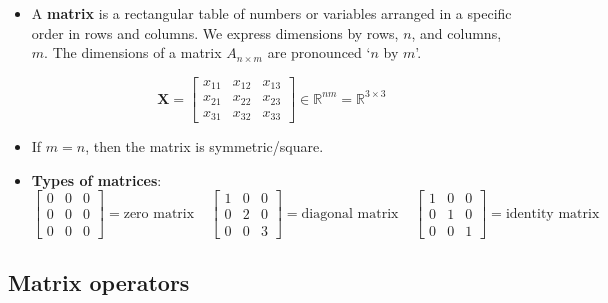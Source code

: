 \begin{itemize}
    \item A \textbf{matrix} is a rectangular table of numbers or variables arranged in a specific order in rows and columns. We express dimensions by rows, $n$, and columns, $m$. The dimensions of a matrix $A_{n \times m}$ are pronounced `$n$ by $m$'. 
    
    \begin{equation*}
        \bm{X} = 
        \begin{bmatrix}
            x_{11} & x_{12} & x_{13} \\
            x_{21} & x_{22} & x_{23} \\
            x_{31} & x_{32} & x_{33} 
        \end{bmatrix} \in
        \mathbb{R}^{nm} = \mathbb{R}^{3 \times 3}
    \end{equation*}

    \item If $m = n$, then the matrix is symmetric/square.
    
    \item \textbf{Types of matrices}:
    \begin{equation*}
        \begin{bmatrix}
            0 & 0 & 0 \\
            0 & 0 & 0 \\
            0 & 0 & 0
        \end{bmatrix} = \text{zero matrix}
        \; \; \; \;
        \begin{bmatrix}
            1 & 0 & 0 \\
            0 & 2 & 0 \\
            0 & 0 & 3
        \end{bmatrix} = \text{diagonal matrix}
        \; \; \; \; 
        \begin{bmatrix}
            1 & 0 & 0 \\
            0 & 1 & 0 \\
            0 & 0 & 1
        \end{bmatrix} = \text{identity matrix}
    \end{equation*}
\end{itemize}

\subsection{Matrix operators}

